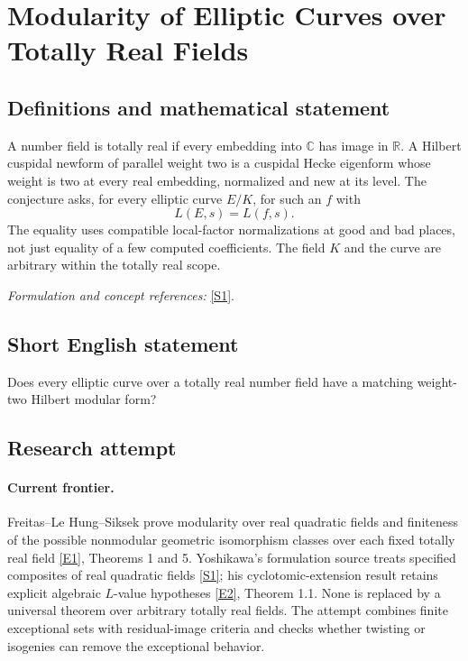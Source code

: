 \documentclass[11pt,a4paper]{article}
\newcommand{\R}{\mathbb{R}}
\newcommand{\C}{\mathbb{C}}
\newcommand{\sref}[2]{\hyperlink{source:#1:#2}{[S#2]}}
\newcommand{\eref}[2]{\hyperlink{extra:#1:#2}{[E#2]}}
\newif\ifshowcatalogue
\newcommand{\cataloguescope}[1]{\ifshowcatalogue
 \paragraph{Exact scope in the supplied catalogue.}
 \begin{quote}\small #1\end{quote}\fi}
\numberwithin{equation}{section}
\begin{document}
\setcounter{section}{66}
\clearpage
\section{\texorpdfstring{Modularity of Elliptic Curves over Totally Real Fields}{Modularity of Elliptic Curves over Totally Real Fields}}\label{67}
\subsection{Definitions and mathematical statement}
A number field is totally real if every embedding into $\C$ has image in $\R$. A Hilbert cuspidal newform of parallel weight two is a cuspidal Hecke eigenform whose weight is two at every real embedding, normalized and new at its level. The conjecture asks, for every elliptic curve $E/K$, for such an $f$ with
\[
 L(E,s)=L(f,s).
\]
The equality uses compatible local-factor normalizations at good and bad places, not just equality of a few computed coefficients. The field $K$ and the curve are arbitrary within the totally real scope.
\par\smallskip\textit{Formulation and concept references:} \sref{67}{1}.
\cataloguescope{For every totally real number field K and every elliptic curve E over K, prove that there is a Hilbert cuspidal newform f over K of parallel weight 2 satisfying L(E,s)=L(f,s).}
\subsection{Short English statement}
Does every elliptic curve over a totally real number field have a matching weight-two Hilbert modular form?
\subsection{Research attempt}

\paragraph{Current frontier.}
Freitas--Le Hung--Siksek prove modularity over real quadratic fields and finiteness of the possible nonmodular geometric isomorphism classes over each fixed totally real field \eref{67}{1}, Theorems 1 and 5. Yoshikawa's formulation source treats specified composites of real quadratic fields \sref{67}{1}; his cyclotomic-extension result retains explicit algebraic $L$-value hypotheses \eref{67}{2}, Theorem 1.1. None is replaced by a universal theorem over arbitrary totally real fields. The attempt combines finite exceptional sets with residual-image criteria and checks whether twisting or isogenies can remove the exceptional behavior.
\end{document}
